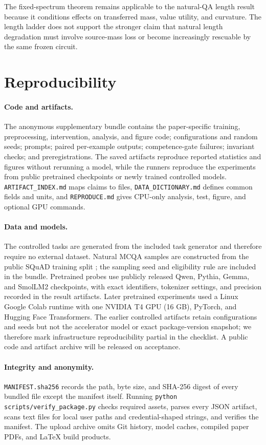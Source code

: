 \documentclass[letterpaper]{article} %
\begin{document}
The fixed-spectrum theorem remains applicable to the natural-QA length result because it conditions effects on
transferred mass, value utility, and curvature. The length ladder does not support the stronger claim that
natural length degradation must involve source\mbox{-}mass loss or become increasingly rescuable by the same
frozen circuit.

\section{Reproducibility}

\paragraph{Code and artifacts.}
The anonymous supplementary bundle contains the paper-specific training, preprocessing, intervention,
analysis, and figure code; configurations and random seeds; prompts; paired per-example outputs;
competence-gate failures; invariant checks; and preregistrations. The saved artifacts reproduce reported
statistics and figures without rerunning a model, while the runners reproduce the experiments from public
pretrained checkpoints or newly trained controlled models. \texttt{ARTIFACT\_INDEX.md} maps claims to files,
\texttt{DATA\_DICTIONARY.md} defines common fields and units, and \texttt{REPRODUCE.md} gives CPU-only analysis,
test, figure, and optional GPU commands.

\paragraph{Data and models.}
The controlled tasks are generated from the included task generator and therefore require no external dataset.
Natural MCQA samples are constructed from the public SQuAD training split \citep{rajpurkar2016squad}; the
sampling seed and eligibility rule are included in the bundle. Pretrained probes use publicly released Qwen,
Pythia, Gemma, and SmolLM2 checkpoints, with exact identifiers, tokenizer settings, and precision recorded in
the result artifacts. Later pretrained experiments used a Linux Google Colab runtime with one NVIDIA T4 GPU
(16 GB), PyTorch, and Hugging Face Transformers. The earlier controlled artifacts retain configurations and
seeds but not the accelerator model or exact package-version snapshot; we therefore mark infrastructure
reproducibility partial in the checklist. A public code and artifact archive will be released on acceptance.

\paragraph{Integrity and anonymity.}
\texttt{MANIFEST.sha256} records the path, byte size, and SHA-256 digest of every bundled file except the
manifest itself. Running \texttt{python scripts/verify\_package.py} checks required assets, parses every JSON
artifact, scans text files for local user paths and credential-shaped strings, and verifies the manifest.
The upload archive omits Git history, model caches, compiled paper PDFs, and LaTeX build products.


\end{document}
